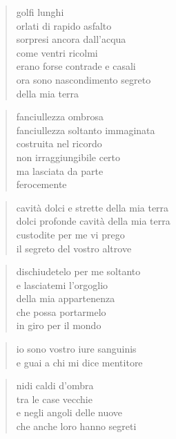 \clearpage


\begin{verse}
    golfi lunghi\\
    orlati di rapido asfalto\\
    sorpresi ancora dall'acqua\\
    come ventri ricolmi\\
    erano forse contrade e casali\\
    ora sono nascondimento segreto\\
    della mia terra
\end{verse}

\clearpage


\begin{verse}
    fanciullezza ombrosa\\
    fanciullezza soltanto immaginata\\
    costruita nel ricordo\\
    non irraggiungibile certo\\
    ma lasciata da parte\\
    ferocemente
\end{verse}

\begin{verse}
    cavità dolci e strette della mia terra\\
    dolci profonde cavità della mia terra\\
    custodite per me vi prego\\
    il segreto del vostro altrove
\end{verse}

\begin{verse}
    dischiudetelo per me soltanto\\
    e lasciatemi l'orgoglio\\
    della mia appartenenza\\
    che possa portarmelo\\
    in giro per il mondo
\end{verse}

\begin{verse}
    io sono vostro iure sanguinis\\
    e guai a chi mi dice mentitore
\end{verse}

\clearpage


\begin{verse}
    nidi caldi d'ombra\\
    tra le case vecchie\\
    e negli angoli delle nuove\\
    che anche loro hanno segreti
\end{verse}

